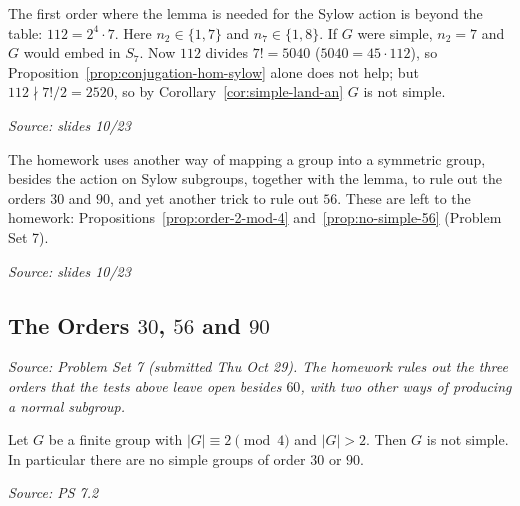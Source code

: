 \documentclass[11pt]{report}
\newcommand{\srcline}[1]{\par\hfill{\footnotesize\textit{Source: #1}}}
\begin{document}
\begin{exbox}[{Order $112$}]\label{ex:order-112}
The first order where the lemma is needed for the Sylow action is beyond the table: $112 = 2^4 \cdot 7$. Here $n_2 \in \{1, 7\}$ and $n_7 \in \{1, 8\}$. If $G$ were simple, $n_2 = 7$ and $G$ would embed in $S_7$. Now $112$ divides $7! = 5040$ ($5040 = 45 \cdot 112$), so Proposition~\ref{prop:conjugation-hom-sylow} alone does not help; but $112 \nmid 7!/2 = 2520$, so by Corollary~\ref{cor:simple-land-an} $G$ is not simple.
\srcline{slides 10/23}
\end{exbox}

\begin{rembox}\label{rem:other-embeddings}
The homework uses another way of mapping a group into a symmetric group, besides the action on Sylow subgroups, together with the lemma, to rule out the orders $30$ and $90$, and yet another trick to rule out $56$. These are left to the homework: Propositions~\ref{prop:order-2-mod-4} and~\ref{prop:no-simple-56} (Problem Set 7).
\srcline{slides 10/23}
\end{rembox}


\subsection{The Orders \texorpdfstring{$30$, $56$ and $90$}{30, 56 and 90}}\label{sub:orders-30-56-90}

\textit{Source: Problem Set 7 (submitted Thu Oct 29). The homework rules out the three orders that the tests above leave open besides $60$, with two other ways of producing a normal subgroup.}

\begin{propbox}\label{prop:order-2-mod-4}
Let $G$ be a finite group with $|G| \equiv 2 \pmod 4$ and $|G| > 2$. Then $G$ is not simple. In particular there are no simple groups of order $30$ or $90$.
\srcline{PS 7.2}
\end{propbox}
\end{document}
